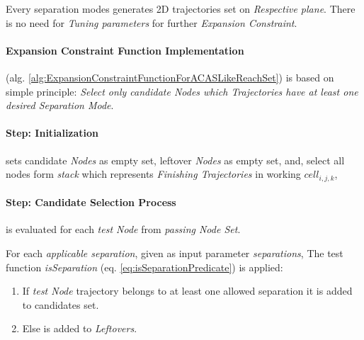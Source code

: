 \begin{note}
    Every separation modes generates 2D trajectories set on \emph{Respective plane}. There is no need for \emph{Tuning parameters} for further \emph{Expansion Constraint}.    
\end{note}

\paragraph{Expansion Constraint Function Implementation} (alg. \ref{alg:ExpansionConstraintFunctionForACASLikeReachSet}) is based on simple principle:
\emph{Select only candidate Nodes which Trajectories have at least one desired Separation Mode}.

\paragraph{Step: Initialization} sets candidate \emph{Nodes} as empty set,  leftover \emph{Nodes} as empty set, and, select all nodes form \emph{stack} which represents \emph{Finishing Trajectories} in working $cell_{i,j,k}$,

\paragraph{Step: Candidate Selection Process} is evaluated for each \emph{test Node} from \emph{passing Node Set}. 

For each \emph{applicable separation}, given as input parameter \emph{separations}, The test function \emph{isSeparation} (eq. \ref{eq:isSeparationPredicate}) is applied:
\begin{enumerate}
    \item If \emph{test Node} trajectory belongs to at least one allowed separation it is added to candidates set.
    \item Else is added to \emph{Leftovers}.
\end{enumerate}

